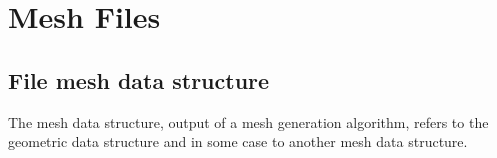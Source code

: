 \documentclass[a4paper,twoside,12pt]{book}
\def\setS#1{#1\label{sec:#1}}
\begin{document}
%
%
%



















\section{\setS{Mesh Files}}
 \def\Chars#1{{\tt (C*)}  #1}
 \def\Char#1{{\tt (C)}  #1}
 \def\Int#1{ {\tt(I)} #1}
 \def\Real#1{{\tt(R)} #1}
 \def\Bool#1{{\tt(B)} #1}
 \def\Vertex#1{{{\tt @@Vertex}#1}}
 \def\Edge#1{{{\tt @@Edge}#1}}
 \def\Triangle#1{{{\tt @@Tria}#1}}
 \def\Quadrangle#1{{{\tt @@Quad}#1}}
 \def\Tetrahedron#1{{{\tt @@Tetra}#1}}
 \def\Hexahedron#1{{{\tt @@Hexa}#1}}
 \def\Pentahedron#1{{{\tt @@Penta}#1}}
 \def\Loop#1#2{{\bf\Large(}\,#1\,{\bf\Large{,\,\,}}\,#2\,{\bf\Large)}}
 \def\requis{\hfill {\it  requis}}
 \def\facultatif{\quad\quad facultatif}
 \def\need#1{\hfill{\it  requiert le champ\,:\,#1}}

\subsection{File mesh data structure}
 \label{meshformatfile.mesh}
The mesh data structure, output of a mesh generation algorithm,
refers to the geometric data structure and in some case to another
mesh data structure.
\end{document}
